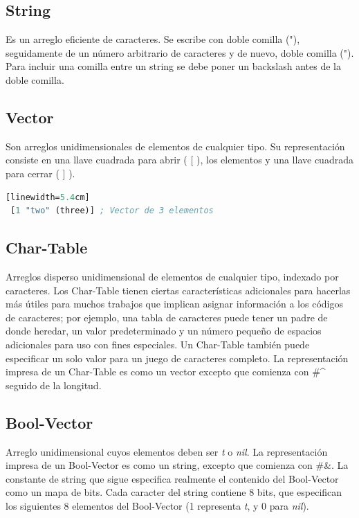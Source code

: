 \documentclass[10pt,journal,compsoc]{IEEEtran}
\begin{document}
\subsection{String}
Es un arreglo eficiente de caracteres. Se escribe con doble comilla ("), seguidamente de un n\'umero arbitrario de caracteres y de nuevo, doble comilla ("). Para incluir una comilla entre un string se debe poner un backslash antes de la doble comilla.

\subsection{Vector}
Son arreglos unidimensionales de elementos de cualquier tipo. Su representaci\'on consiste en una llave cuadrada para abrir ( [ ), los elementos y una llave cuadrada para cerrar ( ] ).

\begin{lstlisting}[language=Lisp, caption = {Ejemplo de vector}][linewidth=5.4cm]
 [1 "two" (three)] ; Vector de 3 elementos
\end{lstlisting}

\subsection{Char-Table}
Arreglos disperso unidimensional de elementos de cualquier tipo, indexado por caracteres. Los Char-Table tienen ciertas caracter\'isticas adicionales para hacerlas m\'as \'utiles para muchos trabajos que implican asignar informaci\'on a los c\'odigos de caracteres; por ejemplo, una tabla de caracteres puede tener un padre de donde heredar, un valor predeterminado y un n\'umero peque\~no de espacios adicionales para uso con fines especiales. Un Char-Table tambi\'en puede especificar un solo valor para un juego de caracteres completo. La representaci\'on impresa de un Char-Table es como un vector excepto que comienza con \#\^{} seguido de la longitud.

\subsection{Bool-Vector}
Arreglo unidimensional cuyos elementos deben ser \emph{t} o \emph{nil}. La representaci\'on impresa de un Bool-Vector es como un string, excepto que comienza con \#\&. La constante de string que sigue especifica realmente el contenido del Bool-Vector como un mapa de bits. Cada caracter del string contiene 8 bits, que especifican los siguientes 8 elementos del Bool-Vector (1 representa \emph{t}, y 0 para \emph{nil}).
\end{document}
